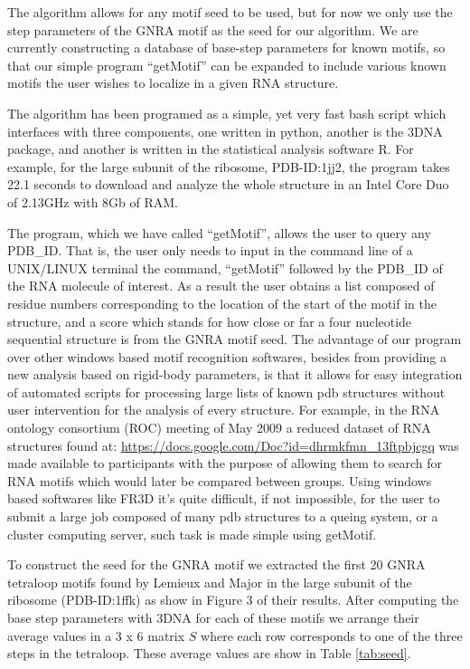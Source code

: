 The algorithm  allows for any  motif seed to  be used, but for  now we
only use the step parameters of the GNRA motif as the seed for our
algorithm.   We are  currently  constructing a  database of  base-step
parameters for  known motifs, so  that our simple  program ``getMotif''
can be expanded  to include various known motifs  the user wishes
to localize in a given RNA structure.

The  algorithm has  been programed  as a  simple, yet  very  fast bash
script which interfaces with  three components, one written in python,
another is the 3DNA package, and another is written in the statistical
analysis  software R.   For  example,  for the  large  subunit of  the
ribosome, PDB-ID:1jj2, the program  takes 22.1 seconds to download and
analyze the whole  structure in an Intel Core Duo  of 2.13GHz with 8Gb
of RAM.

The  program, which  we have  called ``getMotif'',  allows the  user to
query any PDB\_ID. That is, the user only needs to input in the command
line of a UNIX/LINUX terminal the command, ``getMotif'' followed by the
PDB\_ID of the RNA molecule of interest. As a result the user obtains a
list composed of residue numbers  corresponding to the location of the
start of the motif in the  structure, and a score which stands for how
close or far  a four nucleotide sequential structure  is from the GNRA
motif seed.   The advantage  of our program  over other  windows based
motif  recognition softwares,  besides from  providing a  new analysis
based on rigid-body parameters, is that it allows for easy integration
of  automated  scripts  for   processing  large  lists  of  known  pdb
structures  without  user  intervention   for  the  analysis  of  every
structure. For  example, in the RNA ontology  consortium (ROC) meeting
of  May  2009   a  reduced  dataset  of  RNA   structures  found  at:
\url{https://docs.google.com/Doc?id=dhrmkfmn_13ftpbjcgq}    was   made
available to participants with the  purpose of allowing them to search
for RNA  motifs which  would later be  compared between  groups. Using
windows  based  softwares   like  FR3D  \cite{sarver2008}  it's  quite
difficult,  if not  impossible, for  the user  to submit  a  large job
composed  of many  pdb structures  to a  queing system,  or  a cluster
computing server, such task is made simple using getMotif.

To construct  the seed for  the GNRA motif  we extracted the  first 20
GNRA tetraloop motifs found by Lemieux and Major \cite{lemieux2006} in
the large subunit of the ribosome (PDB-ID:1ffk) as show in Figure 3 of
their results. After computing the  base step parameters with 3DNA for
each of these motifs we arrange their average values in a 3 x 6
matrix $S$ where each row corresponds to one of the three steps in the
tetraloop. These average values are show in Table \ref{tab:seed}.

